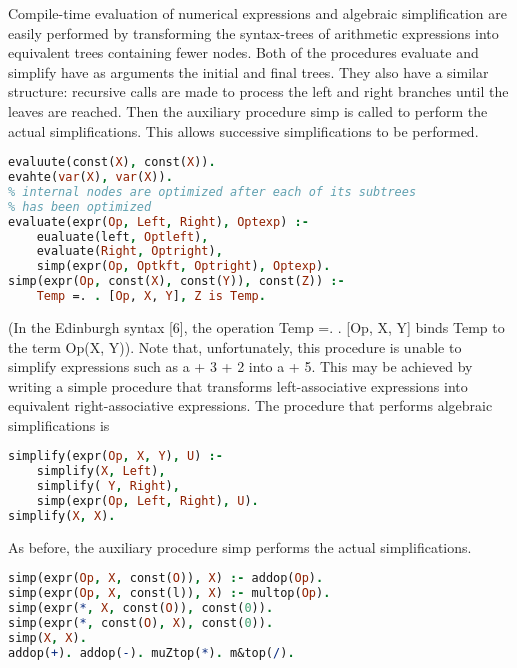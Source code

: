 \label{cohen81}

Compile-time evaluation of numerical expressions and algebraic simplification
are easily performed by transforming the syntax-trees of arithmetic expressions
into equivalent trees containing fewer nodes. Both of the procedures evaluate
and simplify have as arguments the initial and final trees. They also have a
similar structure: recursive calls are made to process the left and right branches
until the leaves are reached. Then the auxiliary procedure simp is called to
perform the actual simplifications. This allows successive simplifications to be
performed. 
\begin{lstlisting}[language=prolog]
% leaves are left unchanged
evaluute(const(X), const(X)).
evahte(var(X), var(X)). 
% internal nodes are optimized after each of its subtrees
% has been optimized
evaluate(expr(Op, Left, Right), Optexp) :-
	eualuate(left, Optleft),
	evaluate(Right, Optright),
	simp(expr(Op, Optkft, Optright), Optexp).
simp(expr(Op, const(X), const(Y)), const(Z)) :-
	Temp =. . [Op, X, Y], Z is Temp. 
\end{lstlisting}

(In the Edinburgh syntax [6], the operation Temp =. . [Op, X, Y] binds Temp to
the term Op(X, Y)). Note that, unfortunately, this procedure is unable to simplify
expressions such as a + 3 + 2 into a + 5. This may be achieved by writing a
simple procedure that transforms left-associative expressions into equivalent
right-associative expressions. The procedure that performs algebraic simplifications
is
\begin{lstlisting}[language=prolog]
simplify(expr(Op, X, Y), U) :-
	simplify(X, Left),
	simplify( Y, Right),
	simp(expr(Op, Left, Right), U).
simplify(X, X). 
\end{lstlisting}

As before, the auxiliary procedure simp performs the actual simplifications.
\begin{lstlisting}[language=prolog]
simp(expr(Op, X, const(O)), X) :- addop(Op).
simp(expr(Op, X, const(l)), X) :- multop(Op).
simp(expr(*, X, const(O)), const(0)).
simp(expr(*, const(O), X), const(0)).
simp(X, X).
addop(+). addop(-). muZtop(*). m&top(/). 
\end{lstlisting}
